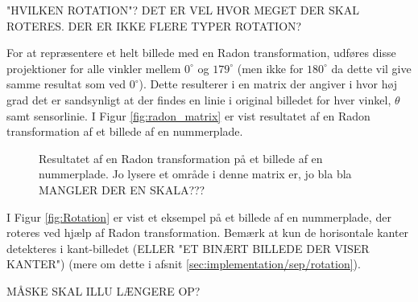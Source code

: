 "HVILKEN ROTATION"? DET ER VEL HVOR MEGET DER SKAL ROTERES. DER ER IKKE FLERE TYPER ROTATION?

For at repræsentere et helt billede med en Radon transformation, udføres disse projektioner for alle vinkler mellem $0^{\circ}$ og $179^{\circ}$ (men ikke for $180^{\circ}$ da dette vil give samme resultat som ved $0^{\circ}$). Dette resulterer i en matrix der angiver i hvor høj grad det er sandsynligt at der findes en linie i original billedet for hver vinkel, $\theta$ samt sensorlinie. I Figur \vref{fig:radon_matrix} er vist resultatet af en Radon transformation af et billede af en nummerplade.

\begin{figure}[htp]
  \centering
  \caption{Resultatet af en Radon transformation på et billede af en nummerplade. Jo lysere et område i denne matrix er, jo bla bla MANGLER DER EN SKALA???}
  \label{fig:radon_matrix}
\end{figure}

I Figur \vref{fig:Rotation} er vist et eksempel på et billede af en nummerplade, der roteres ved hjælp af Radon transformation. Bemærk at kun de horisontale kanter detekteres i kant-billedet (ELLER "ET BINÆRT BILLEDE DER VISER KANTER") (mere om dette i afsnit \vref{sec:implementation/sep/rotation}).

MÅSKE SKAL ILLU LÆNGERE OP?

